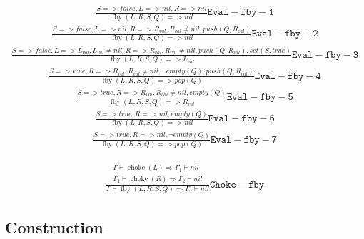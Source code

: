 \documentclass{scrartcl}
\DeclareMathOperator{\fby}{fby}
\DeclareMathOperator{\choke}{choke}
\begin{document}
    \begin{align*}
    \frac{
        S => false, L => nil, R => nil
    }{
        \fby(L, R, S, Q) => nil
    }\mathtt{Eval-fby-1}
    \end{align*}
    \begin{align*}
    \frac{
        S => false, L => nil, R => R_{val}, R_{val} \neq nil, push(Q, R_{val})
    }{
        \fby(L, R, S, Q) => nil
    }\mathtt{Eval-fby-2}
    \end{align*}
    \begin{align*}
    \frac{
        S => false, L => L_{val}, L_{val} \neq nil, R => R_{val}, R_{val} \neq nil, push(Q, R_{val}), set(S, true)
    }{
        \fby(L, R, S, Q) => L_{val}
    }\mathtt{Eval-fby-3}
    \end{align*}
    \begin{align*}
    \frac{
        S => true, R => R_{val}, R_{val} \neq nil, \lnot empty(Q), push(Q, R_{val})
    }{
        \fby(L, R, S, Q) => pop(Q)
    }\mathtt{Eval-fby-4}
    \end{align*}
    \begin{align*}
    \frac{
        S => true, R => R_{val}, R_{val} \neq nil, empty(Q)
    }{
        \fby(L, R, S, Q) => R_{val}
    }\mathtt{Eval-fby-5}
    \end{align*}
    \begin{align*}
    \frac{
        S => true, R => nil, empty(Q)
    }{
        \fby(L, R, S, Q) => nil
    }\mathtt{Eval-fby-6}
    \end{align*}
    \begin{align*}
    \frac{
        S => true, R => nil, \lnot empty(Q)
    }{
        \fby(L, R, S, Q) => pop(Q)
    }\mathtt{Eval-fby-7}
    \end{align*}
    
    \begin{align*}
    \frac{
        \begin{matrix}
        \Gamma \vdash \choke(L) \Rightarrow \Gamma_1 \vdash nil \\
        \Gamma_1 \vdash \choke(R) \Rightarrow \Gamma_2 \vdash nil
        \end{matrix}
    }{
        \Gamma \vdash \fby(L, R, S, Q) \Rightarrow \Gamma_2 \vdash nil
    }\mathtt{Choke-fby}
    \end{align*}
    
    \subsection{Construction}
    
\end{document}
